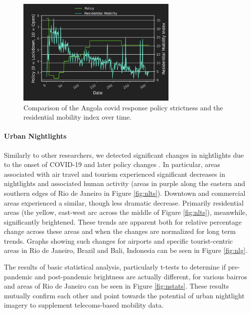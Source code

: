 \begin{figure}[!htb]
\centering
\includegraphics[width=0.7\textwidth]{Figures/chap5/Policy_nat_residential_mob.jpg}
\caption[Angola COVID-19 Policy \& Residential Mobility]{Comparison of the Angola \ac{covid} response policy strictness and the residential mobility index over time.}
\label{fig:policy-residential-mob}
\end{figure}

\paragraph{Urban Nightlights} \leavevmode\newline

Similarly to other researchers, we detected significant changes in nightlights due to the onset of COVID-19 and later policy changes \cite{elvidgeDimmingLightsChina2020, xbsdScipy2021Predicting2021}. In particular, areas associated with air travel and tourism experienced significant decreases in nightlights and associated human activity (areas in purple along the eastern and southern edges of Rio de Janeiro in Figure \ref{fig:nlts}). Downtown and commercial areas experienced a similar, though less dramatic decrease. Primarily residential areas (the yellow, east-west arc across the middle of Figure \ref{fig:nlts}), meanwhile, significantly brightened. These trends are apparent both for relative percentage change across these areas and when the changes are normalized for long term trends. Graphs showing such changes for airports and specific tourist-centric areas in Rio de Janeiro, Brazil and Bali, Indonesia can be seen in Figure \ref{fig:nlg}. 

The results of basic statistical analysis, particularly t-tests to determine if pre-pandemic and post-pandemic brightness are actually different, for various bairros and areas of Rio de Janeiro can be seen in Figure \ref{fig:nstats}. These results mutually confirm each other and point towards the potential of urban nightlight imagery to supplement telecoms-based mobility data.

